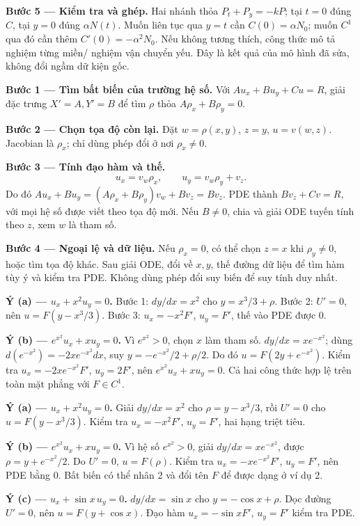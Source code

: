 \textbf{Bước 5 — Kiểm tra và ghép.} Hai nhánh thỏa $P_t+P_y=-kP$; tại $t=0$ đúng $C$, tại $y=0$ đúng $\alpha N(t)$. Muốn liên tục qua $y=t$ cần $C(0)=\alpha N_0$; muốn $C^1$ qua đó cần thêm $C'(0)=-\alpha^2N_0$. Nếu không tương thích, công thức mô tả nghiệm từng miền/ nghiệm vận chuyển yếu. Đây là kết quả của mô hình đã sửa, không đổi ngầm dữ kiện gốc.

\textbf{Bước 1 — Tìm bất biến của trường hệ số.} Với $Au_x+Bu_y+Cu=R$, giải đặc trưng $X'=A,Y'=B$ để tìm $\rho$ thỏa $A\rho_x+B\rho_y=0$.

\textbf{Bước 2 — Chọn tọa độ còn lại.} Đặt $w=\rho(x,y)$, $z=y$, $u=v(w,z)$. Jacobian là $\rho_x$; chỉ dùng phép đổi ở nơi $\rho_x\ne0$.

\textbf{Bước 3 — Tính đạo hàm và thế.}
\[u_x=v_w\rho_x,\qquad u_y=v_w\rho_y+v_z.\]
Do đó $Au_x+Bu_y=(A\rho_x+B\rho_y)v_w+Bv_z=Bv_z$. PDE thành $Bv_z+Cv=R$, với mọi hệ số được viết theo tọa độ mới. Nếu $B\ne0$, chia và giải ODE tuyến tính theo $z$, xem $w$ là tham số.

\textbf{Bước 4 — Ngoại lệ và dữ liệu.} Nếu $\rho_x=0$, có thể chọn $z=x$ khi $\rho_y\ne0$, hoặc tìm tọa độ khác. Sau giải ODE, đổi về $x,y$, thế đường dữ liệu để tìm hàm tùy ý và kiểm tra PDE. Không dùng phép đổi suy biến để suy tính duy nhất.

\textbf{Ý (a) — $u_x+x^2u_y=0$.} Bước 1: $dy/dx=x^2$ cho $y=x^3/3+\rho$. Bước 2: $U'=0$, nên $u=F(y-x^3/3)$. Bước 3: $u_x=-x^2F'$, $u_y=F'$, thế vào PDE được 0.

\textbf{Ý (b) — $e^{x^2}u_x+xu_y=0$.} Vì $e^{x^2}>0$, chọn $x$ làm tham số. $dy/dx=xe^{-x^2}$; dùng $d(e^{-x^2})=-2xe^{-x^2}dx$, suy $y=-e^{-x^2}/2+\rho/2$. Do đó $u=F(2y+e^{-x^2})$. Kiểm tra $u_x=-2xe^{-x^2}F'$, $u_y=2F'$, nên $e^{x^2}u_x+xu_y=0$. Cả hai công thức hợp lệ trên toàn mặt phẳng với $F\in C^1$.

\textbf{Ý (a) — $u_x+x^2u_y=0$.} Giải $dy/dx=x^2$ cho $\rho=y-x^3/3$, rồi $U'=0$ cho $u=F(y-x^3/3)$. Kiểm tra $u_x=-x^2F'$, $u_y=F'$, hai hạng triệt tiêu.

\textbf{Ý (b) — $e^{x^2}u_x+xu_y=0$.} Vì hệ số $e^{x^2}>0$, giải $dy/dx=xe^{-x^2}$, được $\rho=y+e^{-x^2}/2$. Do $U'=0$, $u=F(\rho)$. Kiểm tra $u_x=-xe^{-x^2}F'$, $u_y=F'$, nên PDE bằng 0. Bất biến có thể nhân 2 và đổi tên $F$ để được dạng ở ví dụ 2.

\textbf{Ý (c) — $u_x+\sin x\,u_y=0$.} $dy/dx=\sin x$ cho $y=-\cos x+\rho$. Dọc đường $U'=0$, nên $u=F(y+\cos x)$. Đạo hàm $u_x=-\sin x F'$, $u_y=F'$ kiểm tra PDE.

